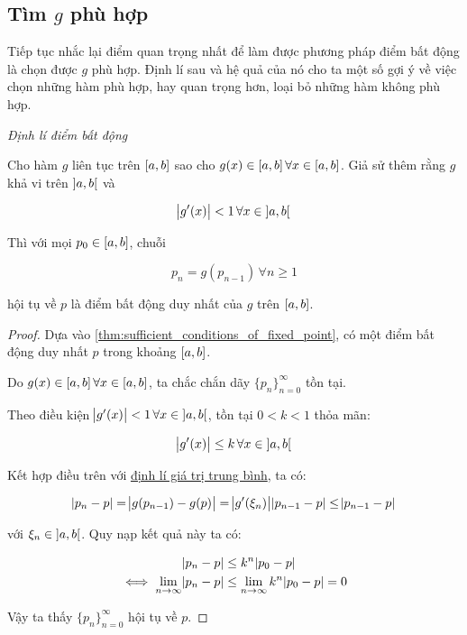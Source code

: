 \documentclass[../../Lectures.tex]{subfiles}
\begin{document}
\subsection{Tìm \texorpdfstring{\(g\)}{g} phù hợp}

Tiếp tục nhắc lại điểm quan trọng nhất để làm được phương pháp điểm bất động là
chọn được \(g\) phù hợp. Định lí sau và hệ quả của nó cho ta một số gợi ý về
việc chọn những hàm phù hợp, hay quan trọng hơn, loại bỏ những hàm không phù
hợp.

\begin{theorem}\label{thm:fixed_point}
    \emph{Định lí điểm bất động}

    Cho hàm \(g\) liên tục trên \(\interval{a}{b}\) sao cho \(g(x) \in
    \interval{a}{b} \, \forall x \in \interval{a}{b}\). Giả sử thêm rằng \(g\)
    khả vi trên \(\interval[open]{a}{b}\) và

    \[\abs{g'(x)} < 1 \, \forall x \in \interval[open]{a}{b}\]

    Thì với mọi \(p_0 \in \interval{a}{b}\), chuỗi

    \[p_n = g(p_{n - 1}) \, \forall n \geq 1\]

    hội tụ về \(p\) là điểm bất động duy nhất của \(g\) trên
    \(\interval{a}{b}\).
\end{theorem}

\begin{proof}\label{proof:thm:fixed_point}
    Dựa vào \ref{thm:sufficient_conditions_of_fixed_point}, có một điểm bất động
    duy nhất \(p\) trong khoảng \(\interval{a}{b}\).

    Do \(g(x) \in \interval{a}{b} \, \forall x \in \interval{a}{b}\), ta chắc
    chắn dãy \(\{p_n\}_{n = 0}^\infty\) tồn tại.

    Theo điều kiện \(\abs{g'(x)} < 1 \, \forall x \in \interval[open]{a}{b}\),
    tồn tại \(0 < k < 1\) thỏa mãn:

    \[\abs{g'(x)} \leq k \, \forall x \in \interval[open]{a}{b}\]

    Kết hợp điều trên với \hyperref[thm:mean_value_theorem]{định lí giá trị
    trung bình}, ta có:

    \[\abs{p_n - p} = \abs{g(p_{n - 1}) - g(p)} = \abs{g'(\xi_n)} \abs{p_{n - 1} - p} \leq \abs{p_{n - 1} - p}\]

    với \(\xi_n \in \interval[open]{a}{b}\). Quy nạp kết quả này ta có:

    \[\begin{aligned}
                                 \abs{p_n - p} & \leq k^n \abs{p_0 - p} \\
        \iff \lim_{n \to \infty} \abs{p_n - p} & \leq \lim_{n \to \infty} k^n \abs{p_0 - p} = 0
    \end{aligned}\]

    Vậy ta thấy \(\{p_n\}_{n = 0}^\infty\) hội tụ về \(p\).
\end{proof}
\end{document}
